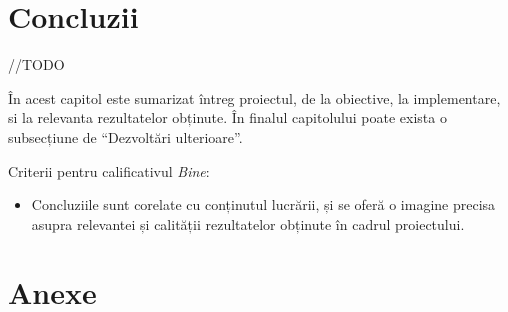 \documentclass[12pt,a4paper]{report}
\numberwithin{equation}{section} %
\begin{document}
\chapter{\label{sec:concluzii}Concluzii}

//TODO

În acest capitol este sumarizat întreg proiectul, de la obiective, la implementare, si la relevanta rezultatelor obținute. În finalul capitolului poate exista o subsecțiune de ``Dezvoltări ulterioare''.

Criterii pentru calificativul \textit{Bine}:
\begin{itemize}
	\item	Concluziile sunt corelate cu conținutul lucrării, și se oferă o imagine precisa asupra relevantei și calității rezultatelor obținute în cadrul proiectului.
\end{itemize}







\chapter*{Anexe}
\end{document}
